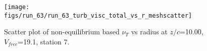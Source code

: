 \begin{figure}[H]
\centering
\texttt{[image: figs/run\_63/run\_63\_turb\_visc\_total\_vs\_r\_meshscatter]}
\caption{Scatter plot of non-equilibrium based $\nu_T$ vs radius at $z/c$=10.00, $V_{free}$=19.1, station 7.}
\label{fig:run_63_turb_visc_total_vs_r_meshscatter}
\end{figure}


